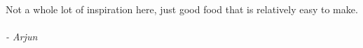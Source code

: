 
Not a whole lot of inspiration here, just good food that is relatively easy to make. 
\\\\
\textit{- Arjun} 